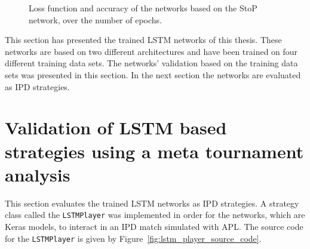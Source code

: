 \begin{figure}[!htbp]
\begin{subfigure}{\textwidth}
    \end{subfigure}
    \caption{Loss function and accuracy of the networks based on the StoP
    network, over the number of epochs.}\label{fig:validation_sequence_to_probability}
\end{figure}

This section has presented the \lstmnetworks trained LSTM networks of this thesis.
These networks are based on two different architectures and have been trained
on four different training data sets. The networks' validation based on the
training data sets was presented in this section. In the next section the networks
are evaluated as IPD strategies.

\section{Validation of LSTM based strategies using a meta tournament analysis}\label{section:rnn_strategy_validation}

This section evaluates the trained LSTM networks as IPD strategies.
A strategy class called the \texttt{LSTMPlayer} was implemented
in order for the networks, which are Keras models, to interact in an IPD match
simulated with APL. The source code for the \texttt{LSTMPlayer} is
given by Figure~\ref{fig:lstm_player_source_code}.

